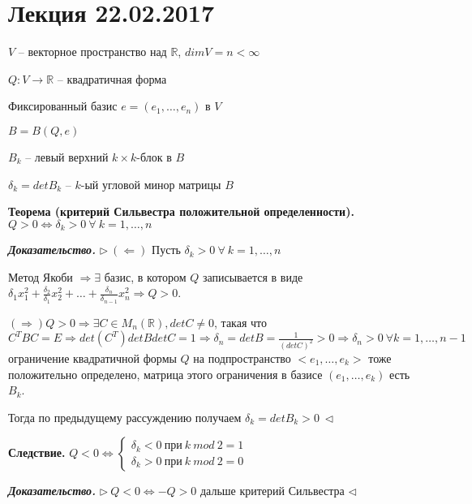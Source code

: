 \section{Лекция 22.02.2017}

$V$ -- векторное пространство над $\mathbb{R}$, $dimV = n < \infty$

$Q: V \rightarrow \mathbb{R}$ -- квадратичная форма

Фиксированный базис $e = (e_1, \dots, e_n)$ в $V$

$B = B(Q, e)$

$B_k$ -- левый верхний $k \times k$-блок в $B$

$\delta_k = det B_k$ -- $k$-ый угловой минор матрицы $B$

\vspace{\baselineskip}
\textbf{Теорема (критерий Сильвестра положительной определенности).} $Q > 0 \Leftrightarrow \delta_k > 0 \ \forall \ k = 1, \dots, n$

\vspace{\baselineskip}
\textbf{\textit{Доказательство.}} $\rhd \ (\Leftarrow)$ Пусть $\delta_k > 0 \ \forall \ k = 1, \dots, n$

Метод Якоби $\Rightarrow \exists$ базис, в котором $Q$ записывается в виде $\delta_1 x_1^2 + \frac{\delta_2}{\delta_1} x_2^2 + \dots + \frac{\delta_n}{\delta_{n-1}} x_n^2 \Rightarrow Q > 0$.

$(\Rightarrow) Q > 0 \Rightarrow \exists C \in M_n(\mathbb{R}), detC \neq 0$, такая что $C^T B C = E \Rightarrow det(C^T) det B det C = 1 \Rightarrow \delta_n = det B = \frac{1}{(det C)^2} > 0 \Rightarrow \delta_n > 0 \ \forall k = 1, \dots, n-1$ ограничение квадратичной формы $Q$ на подпространство $<e_1, \dots, e_k>$ тоже положительно определено, матрица этого ограничения в базисе $(e_1, \dots, e_k)$ есть $B_k$.

Тогда по предыдущему рассуждению получаем $\delta_k = det B_k > 0 \ \lhd$

\vspace{\baselineskip}
\textbf{Следствие.} $Q < 0 \Leftrightarrow \begin{cases} \delta_k < 0 \ при \ k \ mod \ 2 = 1 \\
\delta_k > 0 \ при \ k \ mod \ 2 = 0 \end{cases}$

\vspace{\baselineskip}
\textbf{\textit{Доказательство.}} $\rhd \ Q < 0 \Leftrightarrow - Q > 0$ дальше критерий Сильвестра $\lhd$  

